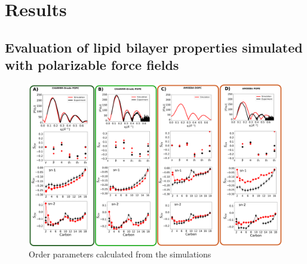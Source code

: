 \documentclass[journal=jacsat,manuscript=article,layout=singlecolumn]{achemso}
\begin{document}
\section{Results}

\subsection{Evaluation of lipid bilayer properties simulated with polarizable force fields}



\begin{figure}[!hbt]
    \centering
    \includegraphics[width=\textwidth]{Figures/quality.pdf}
    \caption{Order parameters calculated from the simulations}
    \label{fig:order_parameters}
\end{figure}
\end{document}
